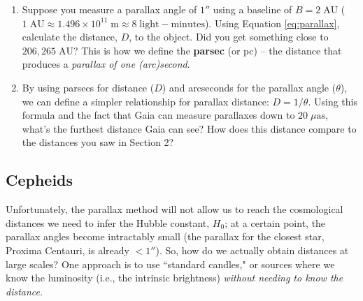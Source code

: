 \documentclass[11pt]{article}
\begin{document}
\begin{enumerate}[resume]
    \item Suppose you measure a parallax angle of $1''$ using a baseline of $B=2\;\mathrm{AU}$ ($1\;\mathrm{AU} \approx 1.496\times 10^{11}\;\mathrm{m} \approx 8\;\mathrm{light{-}minutes}$). Using Equation \ref{eq:parallax}, calculate the distance, $D$, to the object. Did you get something close to $206,265\;\mathrm{AU}$? This is how we define the \textbf{parsec} (or pc) -- the distance that produces a \emph{parallax of one (arc)second}.
    
    \item By using parsecs for distance ($D$) and arcseconds for the parallax angle ($\theta$), we can define a simpler relationship for parallax distance: $D = 1/\theta$. Using this formula and the fact that Gaia can measure parallaxes down to $20\;\mu\mathrm{as}$, what's the furthest distance Gaia can see? How does this distance compare to the distances you saw in Section 2? 
\end{enumerate}


\subsection{Cepheids}\label{sec:cepheids}

Unfortunately, the parallax method will not allow us to reach the cosmological distances we need to infer the Hubble constant, $H_0$; at a certain point, the parallax angles become intractably small (the parallax for the closest star, Proxima Centauri, is already $<1''$). So, how do we actually obtain distances at large scales? One approach is to use ``standard candles," or sources where we know the luminosity (i.e., the intrinsic brightness) \textsl{without needing to know the distance}.
\end{document}
